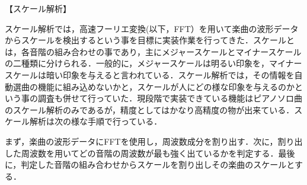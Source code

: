 【スケール解析】
\par
スケール解析では，高速フーリエ変換(以下，FFT）を用いて楽曲の波形データからスケールを検出するという事を目標に実装作業を行ってきた．スケールとは，各音階の組み合わせの事であり，主にメジャースケールとマイナースケールの二種類に分けられる．一般的に，メジャースケールは明るい印象を，マイナースケールは暗い印象を与えると言われている．スケール解析では，その情報を自動選曲の機能に組み込めないかと，スケールが人にどの様な印象を与えるのかという事の調査も併せて行っていた．現段階で実装できている機能はピアノソロ曲のスケール解析のみであるが，精度としてはかなり高精度の物が出来ている．スケール解析は次の様な手順で行っている．\par
まず，楽曲の波形データにFFTを使用し，周波数成分を割り出す．次に，割り出した周波数を用いてどの音階の周波数が最も強く出ているかを判定する．最後に，判定した音階の組み合わせからスケールを割り出しその楽曲のスケールとする．
